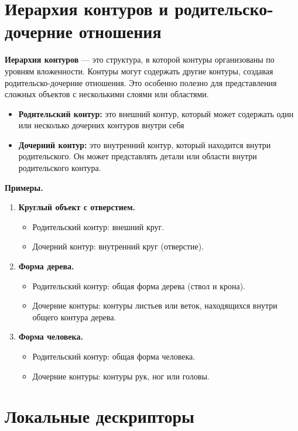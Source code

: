 \documentclass[12pt,a4paper]{article}
\begin{document}
\section{Иерархия контуров и родительско-дочерние отношения}

\textbf{Иерархия контуров} --- это структура, в которой контуры организованы по уровням вложенности. Контуры могут содержать другие контуры, создавая родительско-дочерние отношения. Это особенно полезно для представления сложных объектов с несколькими слоями или областями.

\begin{itemize}
    \item \textbf{Родительский контур:} это внешний контур, который может содержать один или несколько дочерних контуров внутри себя
    \item \textbf{Дочерний контур:}  это внутренний контур, который находится внутри родительского. Он может представлять детали или области внутри родительского контура.
\end{itemize}
\textbf{Примеры.}

\begin{enumerate}
    \item \textbf{Круглый объект с отверстием.}
    \begin{itemize}
        \item Родительский контур: внешний круг.
        \item Дочерний контур: внутренний круг (отверстие).
    \end{itemize}

    \item \textbf{Форма дерева.}
    \begin{itemize}
        \item Родительский контур: общая форма дерева (ствол и крона).
        \item Дочерние контуры: контуры листьев или веток, находящихся внутри общего контура дерева.
    \end{itemize}

    \item \textbf{Форма человека.}
    \begin{itemize}
        \item Родительский контур: общая форма человека.
        \item Дочерние контуры: контуры рук, ног или головы.
    \end{itemize}
\end{enumerate}

\section{Локальные дескрипторы}
\end{document}
